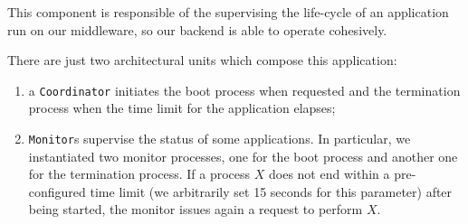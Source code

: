 
This component is responsible of the supervising the life-cycle of an
application run on our middleware, so our backend is able to operate
cohesively.

There are just two architectural units which compose this application:

\begin{enumerate}
\item a \texttt{Coordinator} initiates the boot process when requested and the
  termination process when the time limit for the application elapses;
\item \texttt{Monitor}s supervise the status of some applications. In
  particular, we instantiated two monitor processes, one for the boot process
  and another one for the termination process. If a process $X$ does not end
  within a pre-configured time limit (we arbitrarily set 15 seconds for this
  parameter) after being started, the monitor issues again a request to
  perform $X$.
\end{enumerate}
